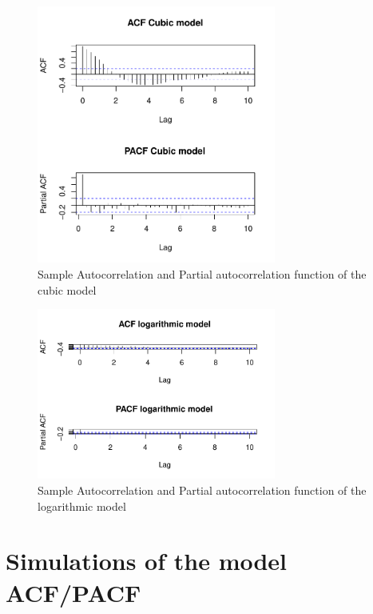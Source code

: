 \documentclass[11pt,a4paper]{article}
\begin{document}
\begin{figure}[H]
    \centering
    \includegraphics[width=0.7\textwidth]{acf_pacf_cubicmodel}
    \caption{Sample Autocorrelation and Partial autocorrelation function of the cubic model}
    \label{fig:acf_pacf_cubicmodel}
\end{figure}

\begin{figure}[H]
    \centering
    \includegraphics[width=0.7\textwidth]{acf_pacf_logmodel}
    \caption{Sample Autocorrelation and Partial autocorrelation function of the logarithmic model}
    \label{fig:acf_pacf_logmodel}
\end{figure}




\section{Simulations of the model ACF/PACF}
\label{sec:simulations}
\end{document}
